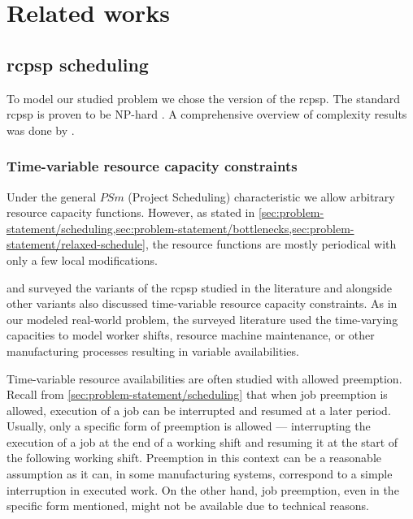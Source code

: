 \chapter{Related works} \label{chap:related-works}

\section{\acs{rcpsp} scheduling} \label{sec:related-works/scheduling-the-rcpsp}

To model our studied problem we chose the \Problem{} version of the \ac{rcpsp}.
The standard \ac{rcpsp} is proven to be NP-hard \citep{Blazewicz1983}.
A comprehensive overview of complexity results was done by \citet{Ganian2021}.

\subsection{Time-variable resource capacity constraints} \label{subsec:related-works/scheduling-the-rcpsp/time-variable-resource-capacity-constraints}

Under the general $PSm$ (Project Scheduling) characteristic we allow arbitrary resource capacity functions.
However, as stated in \cref{sec:problem-statement/scheduling,sec:problem-statement/bottlenecks,sec:problem-statement/relaxed-schedule},
the resource functions are mostly periodical with only a few local modifications.

\citet{Hartmann2010} and \citet{Hartmann2022} surveyed the variants of the \ac{rcpsp} studied in the literature
and alongside other variants also discussed time-variable resource capacity constraints.
As in our modeled real-world problem,
the surveyed literature used the time-varying capacities to model worker shifts,
resource machine maintenance, or other manufacturing processes resulting in variable availabilities.

Time-variable resource availabilities are often studied with allowed preemption.
Recall from \cref{sec:problem-statement/scheduling} that when job preemption is allowed,
execution of a job can be interrupted and resumed at a later period.
Usually, only a specific form of preemption is allowed ---
interrupting the execution of a job at the end of a working shift
and resuming it at the start of the following working shift.
Preemption in this context can be a reasonable assumption as it can,
in some manufacturing systems, correspond to a simple interruption in executed work.
On the other hand, job preemption, even in the specific form mentioned,
might not be available due to technical reasons.

